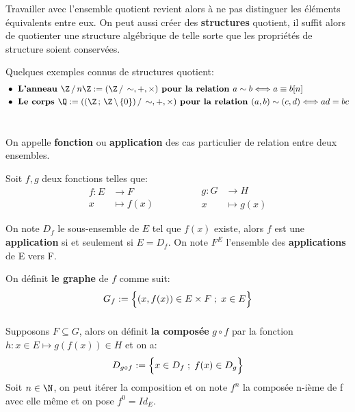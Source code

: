 Travailler avec l'ensemble quotient revient alors à ne pas distinguer les éléments équivalents entre eux.\+
On peut aussi créer des \textbf{structures} quotient, il suffit alors de quotienter une structure algébrique de telle sorte que les propriétés de structure soient conservées.\<

Quelques exemples connus de structures quotient:
\begin{align*}
    &\bullet \textbf{ L'anneau } \Z \,/\, n\Z := (\Z \,/\, \sim, +, \times) \textbf{ pour la relation } a \sim b \Longleftrightarrow a \equiv b [n] \\
    &\bullet \textbf{ Le corps } \Q := ((\Z \, ; \, \Z \, \backslash \, \{0\}) \, / \, \sim, +, \times) \textbf{ pour la relation } (a, b) \sim (c, d) \Longleftrightarrow ad = bc
\end{align*}

\chapter*{}
On appelle \textbf{fonction} ou \textbf{application} des cas particulier de relation entre deux ensembles.\<

Soit \(f, g\) deux fonctions telles que:
\[
   \begin{aligned}
      f: E &\longrightarrow F\\
      x &\longmapsto f(x)
   \end{aligned}
      \hspace{50pt}
   \begin{aligned}
      g: G&\longrightarrow H\\
      x&\longmapsto g(x)
   \end{aligned}
\]

On note \(D_f\) le sous-ensemble de \(E\) tel que \(f(x)\) existe, alors \(f\) est une \textbf{application} si et seulement si \(E = D_f\).\+
On note \(F^E\) l'ensemble des \textbf{applications} de E vers F.\<

On définit \textbf{le graphe} de \(f\) comme suit:
\[
   G_f:= \Bigl\{ (x, f(x)) \in E \times F \; ; \; x \in E\Bigl\}   
\]

\subsection*{}
Supposons \(F \subseteq G\), alors on définit \textbf{la composée} \(g \circ f\) par la fonction \(h: x \in E \longmapsto g(f(x)) \in H\) et on a:
\[
   D_{g \circ f} := \Bigl\{ x \in D_f \; ; \; f(x) \in D_g \Bigl\}   
\]
Soit \(n \in \N\), on peut itérer la composition et on note \(f^{n}\) la composée n-ième de f avec elle même et on pose \(f^0 = Id_E\).
